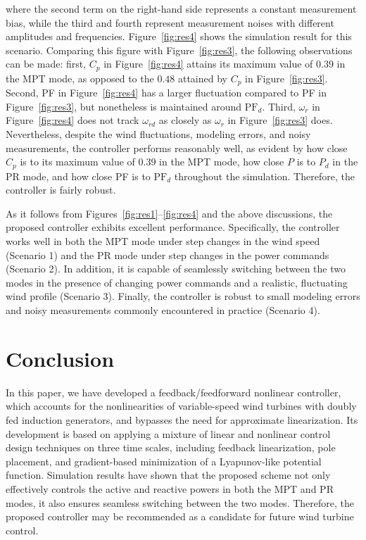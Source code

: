 \documentclass[journal]{IEEEtran}
\begin{document}
where the second term on the right-hand side represents a constant measurement bias, while the third and fourth represent measurement noises with different amplitudes and frequencies. Figure~\ref{fig:res4} shows the simulation result for this scenario. Comparing this figure with Figure~\ref{fig:res3}, the following observations can be made: first, $C_p$ in Figure~\ref{fig:res4} attains its maximum value of $0.39$ in the MPT mode, as opposed to the $0.48$ attained by $C_p$ in Figure~\ref{fig:res3}. Second, PF in Figure~\ref{fig:res4} has a larger fluctuation compared to PF in Figure~\ref{fig:res3}, but nonetheless is maintained around $\text{PF}_d$. Third, $\omega_r$ in Figure~\ref{fig:res4} does not track $\omega_{rd}$ as closely as $\omega_r$ in Figure~\ref{fig:res3} does. Nevertheless, despite the wind fluctuations, modeling errors, and noisy measurements, the controller performs reasonably well, as evident by how close $C_p$ is to its maximum value of $0.39$ in the MPT mode, how close $P$ is to $P_d$ in the PR mode, and how close PF is to $\text{PF}_d$ throughout the simulation. Therefore, the controller is fairly robust.

As it follows from Figures~\ref{fig:res1}--\ref{fig:res4} and the above discussions, the proposed controller exhibits excellent performance. Specifically, the controller works well in both the MPT mode under step changes in the wind speed (Scenario 1) and the PR mode under step changes in the power commands (Scenario 2). In addition, it is capable of seamlessly switching between the two modes in the presence of changing power commands and a realistic, fluctuating wind profile (Scenario 3). Finally, the controller is robust to small modeling errors and noisy measurements commonly encountered in practice (Scenario 4).

\section{Conclusion}\label{sec:concl}

In this paper, we have developed a feedback/feedforward nonlinear controller, which accounts for the nonlinearities of variable-speed wind turbines with doubly fed induction generators, and bypasses the need for approximate linearization. Its development is based on applying a mixture of linear and nonlinear control design techniques on three time scales, including feedback linearization, pole placement, and gradient-based minimization of a Lyapunov-like potential function. Simulation results have shown that the proposed scheme not only effectively controls the active and reactive powers in both the MPT and PR modes, it also ensures seamless switching between the two modes. Therefore, the proposed controller may be recommended as a candidate for future wind turbine control.
\end{document}

